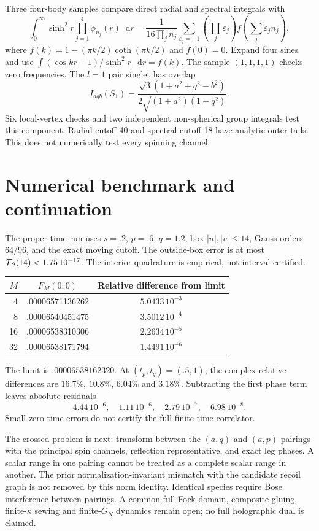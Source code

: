 \documentclass[11pt,a4paper]{article}
\newcommand{\dd}{\mathop{}\!\mathrm d}
\begin{document}
Three four-body samples compare direct radial and spectral integrals with
\begin{equation}
 \int_0^\infty\sinh^2r\prod_{j=1}^4\phi_{n_j}(r)\dd r
 =\frac1{16\prod_j n_j}\sum_{\varepsilon_j=\pm1}
 \left(\prod_j\varepsilon_j\right)f\left(\sum_j\varepsilon_j n_j\right),
\end{equation}
where $f(k)=1-(\pi k/2)\coth(\pi k/2)$ and $f(0)=0$.
Expand four sines and use
$\int(\cos kr-1)/\sinh^2r\,\dd r=f(k)$.
The sample $(1,1,1,1)$ checks zero frequencies.
The $l=1$ pair singlet has overlap
\[
 I_{aqb}(S_1)=\frac{\sqrt3(1+a^2+q^2-b^2)}
                      {2\sqrt{(1+a^2)(1+q^2)}}.
\]
Six local-vertex checks and two independent non-spherical group integrals
test this component. Radial cutoff 40 and spectral cutoff 18 have
analytic outer tails. This does not numerically test every spinning channel.

\newpage
\section{Numerical benchmark and continuation}
The proper-time run uses $s=.2$, $p=.6$, $q=1.2$, box
$|u|,|v|\le14$, Gauss orders 64/96, and the exact moving cutoff.
The outside-box error is at most $ {\cal T}_{.2}(14)<1.75\,10^{-17}$.
The interior quadrature is empirical, not interval-certified.
\begin{center}
\begin{tabular}{rcc}
\toprule
$M$ & $F_M(0,0)$ & Relative difference from limit\\ \midrule
4 & .00006571136262 & $5.0433\,10^{-3}$\\
8 & .00006540451475 & $3.5012\,10^{-4}$\\
16 & .00006538310306 & $2.2634\,10^{-5}$\\
32 & .00006538171794 & $1.4491\,10^{-6}$\\ \bottomrule
\end{tabular}
\end{center}
The limit is $.00006538162320$. At $(t_p,t_q)=(.5,1)$,
the complex relative differences are $16.7\%$, $10.8\%$, $6.04\%$ and $3.18\%$.
Subtracting the first phase term leaves absolute residuals
\[
4.44\,10^{-6},\quad1.11\,10^{-6},\quad2.79\,10^{-7},\quad6.98\,10^{-8}.
\]
Small zero-time errors do not certify the full finite-time correlator.

The crossed problem is next: transform between the $(a,q)$ and $(a,p)$
pairings with the principal spin channels, reflection representative,
and exact leg phases. A scalar range in one pairing cannot be treated as
a complete scalar range in another. The prior normalization-invariant
mismatch with the candidate recoil graph is not removed by this norm identity.
Identical species require Bose interference between pairings.
A common full-Fock domain, composite gluing, finite-$\kappa$ sewing
and finite-$G_N$ dynamics remain open; no full holographic dual is claimed.
\end{document}
